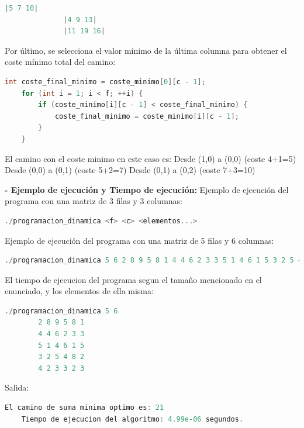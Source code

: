 \documentclass[12pt, letterpaper]{article}
\begin{document}
\begin{itemize}
\begin{lstlisting}[language=C++, basicstyle=\ttfamily\footnotesize,breaklines=true]
              |5 7 10|
              |4 9 13|
              |11 19 16|
            \end{lstlisting}
            Por último, se selecciona el valor mínimo de la última columna para obtener el coste mínimo total del camino:
            \begin{lstlisting}[language=C++, basicstyle=\ttfamily\footnotesize,breaklines=true]
    int coste_final_minimo = coste_minimo[0][c - 1];
    for (int i = 1; i < f; ++i) {
        if (coste_minimo[i][c - 1] < coste_final_minimo) {
            coste_final_minimo = coste_minimo[i][c - 1];
        }
    }
  \end{lstlisting}
            El camino con el coste minimo en este caso es:\newline
            Desde (1,0) a (0,0) (coste 4+1=5)\newline
            Desde (0,0) a (0,1) (coste 5+2=7)\newline
            Desde (0,1) a (0,2) (coste 7+3=10)
          
            \subitem\textbf{- Ejemplo de ejecución y Tiempo de ejecución:}\newline
            Ejemplo de ejecución del programa con una matriz de 3 filas y 3 columnas:
            \begin{lstlisting}[language=C++, basicstyle=\ttfamily\footnotesize,breaklines=true]
        ./programacion_dinamica <f> <c> <elementos...>
            \end{lstlisting}
            Ejemplo de ejecución del programa con una matriz de 5 filas y 6 columnas:
            \begin{lstlisting}[language=C++, basicstyle=\ttfamily\footnotesize,breaklines=true]
        ./programacion_dinamica 5 6 2 8 9 5 8 1 4 4 6 2 3 3 5 1 4 6 1 5 3 2 5 4 8 2 4 2 3 3 2 3
            \end{lstlisting}
            El tiempo de ejecucion del programa segun el tamaño mencionado en el enunciado, y los elementos de ella misma:
            \begin{lstlisting}[language=C++, basicstyle=\ttfamily\footnotesize,breaklines=true]
        ./programacion_dinamica 5 6
        2 8 9 5 8 1
        4 4 6 2 3 3
        5 1 4 6 1 5
        3 2 5 4 8 2
        4 2 3 3 2 3
            \end{lstlisting}
            Salida:
            \begin{lstlisting}[language=C++, basicstyle=\ttfamily\footnotesize,breaklines=true]
    El camino de suma minima optimo es: 21
    Tiempo de ejecucion del algoritmo: 4.99e-06 segundos.
            \end{lstlisting}
            

      \end{itemize}     
    
\end{document}
